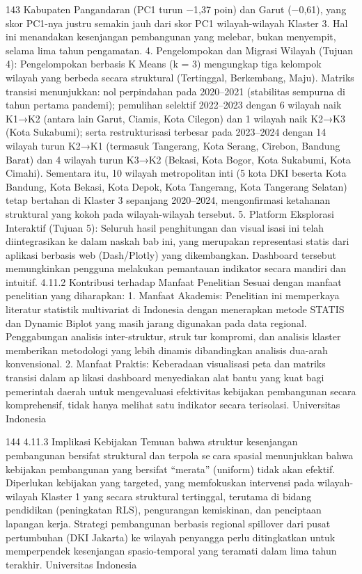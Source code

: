 143
Kabupaten Pangandaran (PC1 turun −1,37 poin) dan Garut (−0,61), yang skor
PC1-nya justru semakin jauh dari skor PC1 wilayah-wilayah Klaster 3. Hal ini
menandakan kesenjangan pembangunan yang melebar, bukan menyempit, selama
lima tahun pengamatan.
4. Pengelompokan dan Migrasi Wilayah (Tujuan 4): Pengelompokan berbasis KMeans (k = 3) mengungkap tiga kelompok wilayah yang berbeda secara struktural
(Tertinggal, Berkembang, Maju). Matriks transisi menunjukkan: nol perpindahan
pada 2020–2021 (stabilitas sempurna di tahun pertama pandemi); pemulihan selektif
2022–2023 dengan 6 wilayah naik K1→K2 (antara lain Garut, Ciamis, Kota Cilegon)
dan 1 wilayah naik K2→K3 (Kota Sukabumi); serta restrukturisasi terbesar pada
2023–2024 dengan 14 wilayah turun K2→K1 (termasuk Tangerang, Kota Serang,
Cirebon, Bandung Barat) dan 4 wilayah turun K3→K2 (Bekasi, Kota Bogor, Kota
Sukabumi, Kota Cimahi). Sementara itu, 10 wilayah metropolitan inti (5 kota DKI
beserta Kota Bandung, Kota Bekasi, Kota Depok, Kota Tangerang, Kota Tangerang
Selatan) tetap bertahan di Klaster 3 sepanjang 2020–2024, mengonfirmasi ketahanan
struktural yang kokoh pada wilayah-wilayah tersebut.
5. Platform Eksplorasi Interaktif (Tujuan 5): Seluruh hasil penghitungan dan visualisasi ini telah diintegrasikan ke dalam naskah bab ini, yang merupakan representasi
statis dari aplikasi berbasis web (Dash/Plotly) yang dikembangkan. Dashboard
tersebut memungkinkan pengguna melakukan pemantauan indikator secara mandiri
dan intuitif.
4.11.2 Kontribusi terhadap Manfaat Penelitian
Sesuai dengan manfaat penelitian yang diharapkan:
1. Manfaat Akademis: Penelitian ini memperkaya literatur statistik multivariat di
Indonesia dengan menerapkan metode STATIS dan Dynamic Biplot yang masih
jarang digunakan pada data regional. Penggabungan analisis inter-struktur, struktur kompromi, dan analisis klaster memberikan metodologi yang lebih dinamis
dibandingkan analisis dua-arah konvensional.
2. Manfaat Praktis: Keberadaan visualisasi peta dan matriks transisi dalam aplikasi dashboard menyediakan alat bantu yang kuat bagi pemerintah daerah untuk
mengevaluasi efektivitas kebijakan pembangunan secara komprehensif, tidak hanya
melihat satu indikator secara terisolasi.
Universitas Indonesia

144
4.11.3 Implikasi Kebijakan
Temuan bahwa struktur kesenjangan pembangunan bersifat struktural dan terpola secara spasial menunjukkan bahwa kebijakan pembangunan yang bersifat “merata” (uniform)
tidak akan efektif. Diperlukan kebijakan yang targeted, yang memfokuskan intervensi pada
wilayah-wilayah Klaster 1 yang secara struktural tertinggal, terutama di bidang pendidikan
(peningkatan RLS), pengurangan kemiskinan, dan penciptaan lapangan kerja. Strategi
pembangunan berbasis regional spillover dari pusat pertumbuhan (DKI Jakarta) ke wilayah
penyangga perlu ditingkatkan untuk memperpendek kesenjangan spasio-temporal yang
teramati dalam lima tahun terakhir.
Universitas Indonesia


